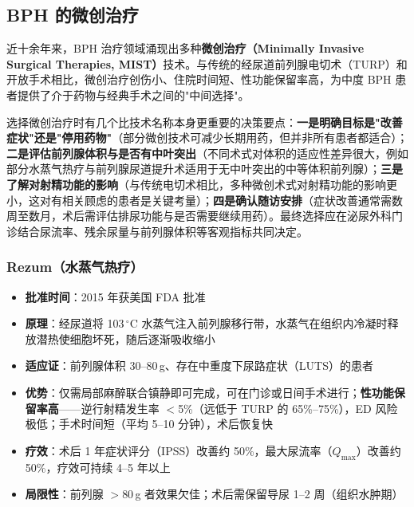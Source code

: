 \documentclass[12pt,a4paper,twoside]{ctexbook}
\begin{document}
\subsection{BPH 的微创治疗}
\label{subsec:bph_minitreatment}

近十余年来，BPH 治疗领域涌现出多种\textbf{微创治疗（Minimally Invasive Surgical Therapies, MIST）}技术。与传统的经尿道前列腺电切术（TURP）和开放手术相比，微创治疗创伤小、住院时间短、性功能保留率高，为中度 BPH 患者提供了介于药物与经典手术之间的"中间选择"。

选择微创治疗时有几个比技术名称本身更重要的决策要点：\textbf{一是明确目标是"改善症状"还是"停用药物"}（部分微创技术可减少长期用药，但并非所有患者都适合）；\textbf{二是评估前列腺体积与是否有中叶突出}（不同术式对体积的适应性差异很大，例如部分水蒸气热疗与前列腺尿道提升术适用于无中叶突出的中等体积前列腺）；\textbf{三是了解对射精功能的影响}（与传统电切术相比，多种微创术式对射精功能的影响更小，这对有相关顾虑的患者是关键考量）；\textbf{四是确认随访安排}（症状改善通常需数周至数月，术后需评估排尿功能与是否需要继续用药）。最终选择应在泌尿外科门诊结合尿流率、残余尿量与前列腺体积等客观指标共同决定。

\subsubsection{Rezum（水蒸气热疗）}
\begin{itemize}[leftmargin=2cm]
	\item \textbf{批准时间}：2015 年获美国 FDA 批准
	\item \textbf{原理}：经尿道将 103\,$^\circ$C 水蒸气注入前列腺移行带，水蒸气在组织内冷凝时释放潜热使细胞坏死，随后逐渐吸收缩小
	\item \textbf{适应证}：前列腺体积 30--80\,g、存在中重度下尿路症状（LUTS）的患者
	\item \textbf{优势}：仅需局部麻醉联合镇静即可完成，可在门诊或日间手术进行；\textbf{性功能保留率高}——逆行射精发生率 $<$5\%（远低于 TURP 的 65\%--75\%），ED 风险极低；手术时间短（平均 5--10 分钟），术后恢复快
	\item \textbf{疗效}：术后 1 年症状评分（IPSS）改善约 50\%，最大尿流率（$Q_{\max}$）改善约 50\%，疗效可持续 4--5 年以上
	\item \textbf{局限性}：前列腺 $>80$\,g 者效果欠佳；术后需保留导尿 1--2 周（组织水肿期）
\end{itemize}
\end{document}
